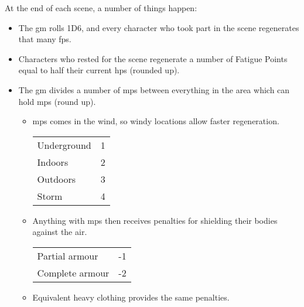 At the end of each scene, a number of things happen:

\begin{itemize}
  \item
  The \gls{gm} rolls 1D6, and every character who took part in the scene regenerates that many \glspl{fp}.
  \item
  Characters who rested for the scene regenerate a number of Fatigue Points equal to half their current \glspl{hp} (rounded up).
  \item
  The \gls{gm} divides a number of \glspl{mp} between everything in the area which can hold \glspl{mp} (round up).
  \begin{itemize}
    \item
    \Glspl{mp} comes in the wind, so windy locations allow faster regeneration.

    \begin{tabularx}{\linewidth}{Xc}
    \hline
    Underground & 1 \\
    Indoors     & 2 \\
    Outdoors    & 3 \\
    Storm       & 4 \\
    \hline
    \end{tabularx}
    \item
    Anything with \glspl{mp} then receives penalties for shielding their bodies against the air.

    \begin{tabularx}{\linewidth}{Xc}
    \hline
    Partial armour  & -1 \\
    Complete armour & -2 \\
    \hline
    \end{tabularx}
    \item
    Equivalent heavy clothing provides the same penalties.
  \end{itemize}
\end{itemize}
